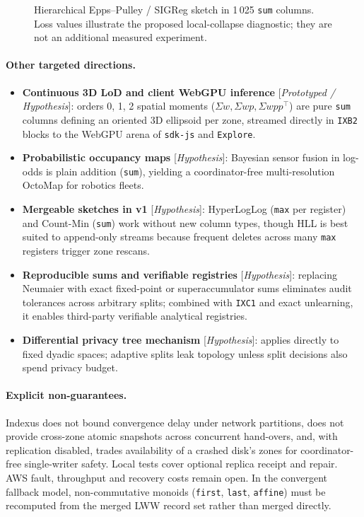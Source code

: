 \documentclass[11pt]{article}
\begin{document}
\begin{figure}[H]
    \centering
    \caption{Hierarchical Epps--Pulley / SIGReg sketch in 1\,025 \texttt{sum} columns. Loss values illustrate the proposed local-collapse diagnostic; they are not an additional measured experiment.}
\end{figure}

\paragraph{Other targeted directions.}
\begin{itemize}[leftmargin=1.5em,itemsep=1pt]
  \item \textbf{Continuous 3D LoD and client WebGPU inference} [\emph{Prototyped / Hypothesis}]: orders 0, 1, 2 spatial moments ($\Sigma w, \Sigma w p, \Sigma w p p^\top$) are pure \texttt{sum} columns defining an oriented 3D ellipsoid per zone, streamed directly in \texttt{IXB2} blocks to the WebGPU arena of \texttt{sdk-js} and \texttt{Explore}.
  \item \textbf{Probabilistic occupancy maps} [\emph{Hypothesis}]: Bayesian sensor fusion in log-odds is plain addition (\texttt{sum}), yielding a coordinator-free multi-resolution OctoMap for robotics fleets.
  \item \textbf{Mergeable sketches in v1} [\emph{Hypothesis}]: HyperLogLog (\texttt{max} per register) and Count-Min (\texttt{sum}) work without new column types, though HLL is best suited to append-only streams because frequent deletes across many \texttt{max} registers trigger zone rescans.
  \item \textbf{Reproducible sums and verifiable registries} [\emph{Hypothesis}]: replacing Neumaier with exact fixed-point or superaccumulator sums eliminates audit tolerances across arbitrary splits; combined with \texttt{IXC1} and exact unlearning, it enables third-party verifiable analytical registries.
  \item \textbf{Differential privacy tree mechanism} [\emph{Hypothesis}]: applies directly to fixed dyadic spaces; adaptive splits leak topology unless split decisions also spend privacy budget.
\end{itemize}

\paragraph{Explicit non-guarantees.}
Indexus does not bound convergence delay under network partitions, does not provide cross-zone atomic snapshots across concurrent hand-overs, and, with replication disabled, trades availability of a crashed disk's zones for coordinator-free single-writer safety. Local tests cover optional replica receipt and repair. AWS fault, throughput and recovery costs remain open. In the convergent fallback model, non-commutative monoids (\texttt{first}, \texttt{last}, \texttt{affine}) must be recomputed from the merged LWW record set rather than merged directly.
\end{document}
